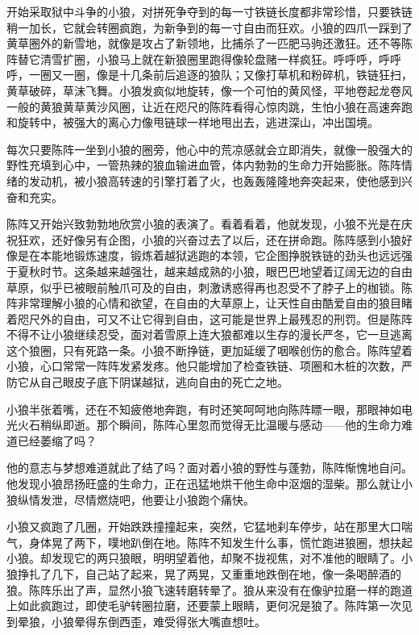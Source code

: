 \par 开始采取狱中斗争的小狼，对拼死争夺到的每一寸铁链长度都非常珍惜，只要铁链稍一加长，它就会转圈疯跑，为新争到的每一寸自由而狂欢。小狼的四爪一踩到了黄草圈外的新雪地，就像是攻占了新领地，比捕杀了一匹肥马驹还激狂。还不等陈阵替它清雪扩圈，小狼马上就在新狼圈里跑得像轮盘赌一样疯狂。呼呼呼，呼呼呼，一圈又一圈，像是十几条前后追逐的狼队；又像打草机和粉碎机，铁链狂扫，黄草破碎，草沫飞舞。小狼发疯似地旋转，像一个可怕的黄风怪，平地卷起龙卷风一般的黄狼黄草黄沙风圈，让近在咫尺的陈阵看得心惊肉跳，生怕小狼在高速奔跑和旋转中，被强大的离心力像甩链球一样地甩出去，逃进深山，冲出国境。
\par 每次只要陈阵一坐到小狼的圈旁，他心中的荒凉感就会立即消失，就像一股强大的野性充填到心中，一管热辣的狼血输进血管，体内勃勃的生命力开始膨胀。陈阵情绪的发动机，被小狼高转速的引擎打着了火，也轰轰隆隆地奔突起来，使他感到兴奋和充实。
\par 陈阵又开始兴致勃勃地欣赏小狼的表演了。看着看着，他就发现，小狼不光是在庆祝狂欢，还好像另有企图，小狼的兴奋过去了以后，还在拼命跑。陈阵感到小狼好像是在本能地锻炼速度，锻炼着越狱逃跑的本领，它企图挣脱铁链的劲头也远远强于夏秋时节。这条越来越强壮，越来越成熟的小狼，眼巴巴地望着辽阔无边的自由草原，似乎已被眼前触爪可及的自由，刺激诱惑得再也忍受不了脖子上的枷锁。陈阵非常理解小狼的心情和欲望，在自由的大草原上，让天性自由酷爱自由的狼目睹着咫尺外的自由，可又不让它得到自由，这可能是世界上最残忍的刑罚。但是陈阵不得不让小狼继续忍受，面对着雪原上连大狼都难以生存的漫长严冬，它一旦逃离这个狼圈，只有死路一条。小狼不断挣链，更加延缓了咽喉创伤的愈合。陈阵望着小狼，心口常常一阵阵发紧发疼。他只能增加了检查铁链、项圈和木桩的次数，严防它从自己眼皮子底下阴谋越狱，逃向自由的死亡之地。
\par 小狼半张着嘴，还在不知疲倦地奔跑，有时还笑呵呵地向陈阵瞟一眼，那眼神如电光火石稍纵即逝。那个瞬间，陈阵心里忽而觉得无比温暖与感动——他的生命力难道已经萎缩了吗？
\par 他的意志与梦想难道就此了结了吗？面对着小狼的野性与蓬勃，陈阵惭愧地自问。他发现小狼昂扬旺盛的生命力，正在迅猛地烘干他生命中沤烟的湿柴。那么就让小狼纵情发泄，尽情燃烧吧，他要让小狼跑个痛快。
\par 小狼又疯跑了几圈，开始跌跌撞撞起来，突然，它猛地刹车停步，站在那里大口喘气，身体晃了两下，噗地趴倒在地。陈阵不知发生什么事，慌忙跑进狼圈，想扶起小狼。却发现它的两只狼眼，明明望着他，却聚不拢视焦，对不准他的眼睛了。小狼挣扎了几下，自己站了起来，晃了两晃，又重重地跌倒在地，像一条喝醉酒的狼。陈阵乐出了声，显然小狼飞速转磨转晕了。狼从来没有在像驴拉磨一样的跑道上如此疯跑过，即使毛驴转圈拉磨，还要蒙上眼睛，更何况是狼了。陈阵第一次见到晕狼，小狼晕得东倒西歪，难受得张大嘴直想吐。
